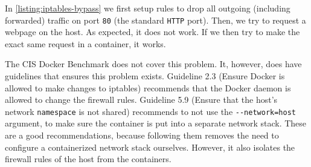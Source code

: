 In \autoref{listing:iptables-bypass} we first setup rules to drop all outgoing (including forwarded) traffic on port \lstinline{80} (the standard \lstinline{HTTP} port). Then, we try to request a webpage on the host. As expected, it does not work. If we then try to make the exact same request in a container, it works.

\medskip

The CIS Docker Benchmark does not cover this problem. It, however, does have guidelines that ensures this problem exists. Guideline 2.3 (Ensure Docker is allowed to make changes to iptables) recommends that the Docker daemon is allowed to change the firewall rules. Guideline 5.9 (Ensure that the host's network \lstinline{namespace} is not shared) recommends to not use the \lstinline{--network=host} argument, to make sure the container is put into a separate network stack. These are a good recommendations, because following them removes the need to configure a containerized network stack ourselves. However, it also isolates the firewall rules of the host from the containers.
